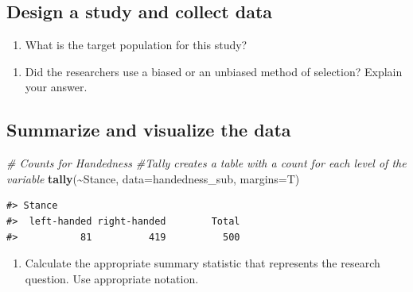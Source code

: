 \documentclass[
]{report}
\newenvironment{Shaded}{\begin{snugshade}}{\end{snugshade}}
\newcommand{\CommentTok}[1]{\textcolor[rgb]{0.56,0.35,0.01}{\textit{#1}}}
\newcommand{\DataTypeTok}[1]{\textcolor[rgb]{0.13,0.29,0.53}{#1}}
\newcommand{\KeywordTok}[1]{\textcolor[rgb]{0.13,0.29,0.53}{\textbf{#1}}}
\newcommand{\NormalTok}[1]{#1}
\newcommand{\OperatorTok}[1]{\textcolor[rgb]{0.81,0.36,0.00}{\textbf{#1}}}
\providecommand{\tightlist}{%
  \setlength{\itemsep}{0pt}\setlength{\parskip}{0pt}}
\begin{document}
\vspace{1in}

\hypertarget{design-a-study-and-collect-data}{%
\subsection{Design a study and collect data}\label{design-a-study-and-collect-data}}

\begin{enumerate}
\def\labelenumi{\arabic{enumi}.}
\setcounter{enumi}{5}
\tightlist
\item
  What is the target population for this study?
\end{enumerate}

\vspace{0.5in}

\begin{enumerate}
\def\labelenumi{\arabic{enumi}.}
\setcounter{enumi}{6}
\tightlist
\item
  Did the researchers use a biased or an unbiased method of selection? Explain your answer.
\end{enumerate}

\vspace{1in}

\hypertarget{summarize-and-visualize-the-data}{%
\subsection{Summarize and visualize the data}\label{summarize-and-visualize-the-data}}

\begin{Shaded}
\begin{Highlighting}[]
\CommentTok{\# Counts for Handedness}
\CommentTok{\#Tally creates a table with a count for each level of the variable}
\KeywordTok{tally}\NormalTok{(}\OperatorTok{\textasciitilde{}}\NormalTok{Stance, }\DataTypeTok{data=}\NormalTok{handedness\_sub, }\DataTypeTok{margins=}\NormalTok{T) }
\end{Highlighting}
\end{Shaded}

\begin{verbatim}
#> Stance
#>  left-handed right-handed        Total 
#>           81          419          500
\end{verbatim}

\begin{enumerate}
\def\labelenumi{\arabic{enumi}.}
\setcounter{enumi}{7}
\tightlist
\item
  Calculate the appropriate summary statistic that represents the research question. Use appropriate notation.
\end{enumerate}
\end{document}

